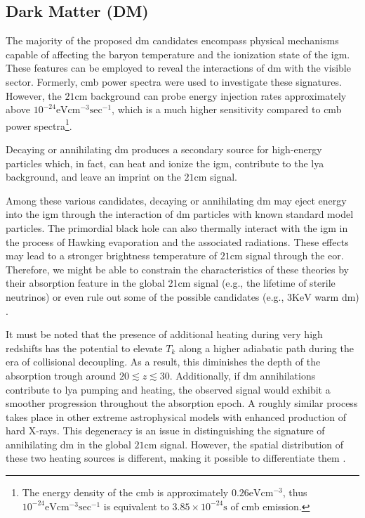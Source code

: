 \documentclass[12pt, TexShade, letterpaper]{report}
\begin{document}
\subsection{Dark Matter (DM)}
The majority of the proposed \gls{dm} candidates encompass physical mechanisms capable of affecting the baryon temperature and the ionization state of the \gls{igm}. These features can be employed to reveal the interactions of \gls{dm} with the visible sector. Formerly, \gls{cmb} power spectra were used to investigate these signatures. However, the $\mathrm{21cm}$ background can probe energy injection rates approximately above $\mathrm{10^{-24}eV cm^{-3} sec^{-1}}$, which is a much higher sensitivity compared to \gls{cmb} power spectra\footnote{The energy density of the \gls{cmb} is approximately $\mathrm{0.26 eV cm^{-3}}$, thus $\mathrm{10^{-24}eV cm^{-3} sec^{-1}}$ is equivalent to $\mathrm{3.85 \times 10^{-24} s}$ of \gls{cmb} emission.}.\par
Decaying or annihilating \gls{dm} produces a secondary source for high-energy particles which, in fact, can heat and ionize the \gls{igm}, contribute to the \gls{lya} background, and leave an imprint on the $\mathrm{21cm}$ signal.\par
Among these various candidates, decaying or annihilating \gls{dm} may eject energy into the \gls{igm} through the interaction of \gls{dm} particles with known standard model particles. The primordial black hole can also thermally interact with the \gls{igm} in the process of Hawking evaporation and the associated radiations. These effects may lead to a stronger brightness temperature of $\mathrm{21cm}$ signal through the \gls{eor}.  Therefore, we might be able to constrain the characteristics of these theories by their absorption feature in the global 21cm signal (e.g., the lifetime of sterile neutrinos) or even rule out some of the possible candidates (e.g., $\mathrm{3 KeV}$ warm \gls{dm}) \cite{DM_anihilation_furlantto, constrain_dm_21, DM_anihilation_1, DM_ionize, dark_cosmology_21, snowmass_dm, rule_out, primordial_bh, new_physics_thesis, primordial_bh_binary, 21limit_dm_bh, bound_dm, sterile_neutrino}.\par

It must be noted that the presence of additional heating during very high redshifts has the potential to elevate $T_k$ along a higher adiabatic path during the era of collisional decoupling. As a result, this diminishes the depth of the absorption trough around $20 \lesssim z \lesssim 30$. Additionally, if \gls{dm} annihilations contribute to \gls{lya} pumping and heating, the observed signal would exhibit a smoother progression throughout the absorption epoch. A roughly similar process takes place in other extreme astrophysical models with enhanced production of hard X-rays. This degeneracy is an issue in distinguishing the signature of annihilating \gls{dm} in the global $\mathrm{21cm}$ signal. However, the spatial distribution of these two heating sources is different, making it possible to differentiate them \cite{dark_nature_21}. \par
\end{document}
